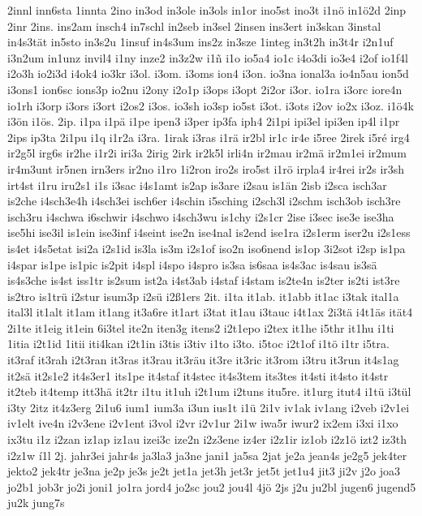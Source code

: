 {2innl
inn6sta
1innta
2ino
in3od
in3ole
in3ols
in1or
ino5st
ino3t
i1nö
in1ö2d
2inp
2inr
2ins.
ins2am
insch4
in7schl
in2seb
in3sel
2insen
ins3ert
in3skan
3instal
in4s3tät
in5sto
in3s2u
1insuf
in4s3um
ins2z
in3sze
1integ
in3t2h
in3t4r
i2n1uf
i3n2um
in1unz
invil4
i1ny
inze2
in3z2w
i1ñ
i1o
io5a4
io1c
i4o3di
io3e4
i2of
io1f4l
i2o3h
io2i3d
i4ok4
io3kr
i3ol.
i3om.
i3oms
ion4
i3on.
io3na
ional3a
io4n5au
ion5d
i3ons1
ion6sc
ions3p
io2nu
i2ony
i2o1p
i3ops
i3opt
2i2or
i3or.
io1ra
i3orc
iore4n
io1rh
i3orp
i3ors
i3ort
i2os2
i3os.
io3sh
io3sp
io5st
i3ot.
i3ots
i2ov
io2x
i3oz.
i1ö4k
i3ön
i1ös.
2ip.
i1pa
i1pä
i1pe
ipen3
i3per
ip3fa
iph4
2i1pi
ipi3el
ipi3en
ip4l
i1pr
2ips
ip3ta
2i1pu
i1q
i1r2a
i3ra.
1irak
i3ras
i1rä
ir2bl
ir1c
ir4e
i5ree
2irek
i5ré
irg4
ir2g5l
irg6s
ir2he
i1r2i
iri3a
2irig
2irk
ir2k5l
irli4n
ir2mau
ir2mä
ir2m1ei
ir2mum
ir4m3unt
ir5nen
irn3ers
ir2no
i1ro
1i2ron
iro2s
iro5st
i1rö
irpla4
ir4rei
ir2s
ir3sh
irt4st
i1ru
iru2s1
i1s
i3sac
i4s1amt
is2ap
is3are
i2sau
is1än
2isb
i2sca
isch3ar
is2che
i4sch3e4h
i4sch3ei
isch6er
i4schin
i5sching
i2sch3l
i2schm
isch3ob
isch3re
isch3ru
i4schwa
i6schwir
i4schwo
i4sch3wu
is1chy
i2s1cr
2ise
i3sec
ise3e
ise3ha
ise5hi
ise3il
is1ein
ise3inf
i4seint
ise2n
ise4nal
is2end
ise1ra
i2s1erm
iser2u
i2s1ess
is4et
i4s5etat
isi2a
i2s1id
is3la
is3m
i2s1of
iso2n
iso6nend
is1op
3i2sot
i2sp
is1pa
i4spar
is1pe
is1pic
is2pit
i4spl
i4spo
i4spro
is3sa
is6saa
is4s3ac
is4sau
is3sä
is4s3che
is4st
iss1tr
is2sum
ist2a
i4st3ab
i4staf
i4stam
is2te4n
is2ter
is2ti
ist3re
is2tro
is1trü
i2stur
isum3p
i2sü
i2ß1ers
2it.
i1ta
it1ab.
it1abb
it1ac
i3tak
ital1a
ital3l
it1alt
it1am
it1ang
it3a6re
it1art
i3tat
it1au
i3tauc
i4t1ax
2i3tä
i4t1äs
ität4
2i1te
it1eig
it1ein
6i3tel
ite2n
iten3g
itens2
i2t1epo
i2tex
it1he
i5thr
it1hu
i1ti
1itia
i2t1id
1itii
iti4kan
i2t1in
i3tis
i3tiv
i1to
i3to.
i5toc
i2t1of
i1tö
i1tr
i5tra.
it3raf
it3rah
i2t3ran
it3ras
it3rau
it3räu
it3re
it3ric
it3rom
i3tru
it3run
it4s1ag
it2sä
it2s1e2
it4s3er1
its1pe
it4staf
it4stec
it4s3tem
its3tes
it4sti
it4sto
it4str
it2teb
it4temp
itt3hä
it2tr
i1tu
it1uh
i2t1um
i2tuns
itu5re.
it1urg
itut4
i1tü
i3tül
i3ty
2itz
it4z3erg
2i1u6
ium1
ium3a
i3un
ius1t
i1ü
2i1v
iv1ak
iv1ang
i2veb
i2v1ei
iv1elt
ive4n
i2v3ene
i2v1ent
i3vol
i2vr
i2v1ur
2i1w
iwa5r
iwur2
ix2em
i3xi
i1xo
ix3tu
i1z
i2zan
iz1ap
iz1au
izei3c
ize2n
i2z3ene
iz4er
i2z1ir
iz1ob
i2z1ö
izt2
iz3th
i2z1w
í1l
2j.
jahr3ei
jahr4s
ja3la3
ja3ne
jani1
ja5sa
2jat
je2a
jean4s
je2g5
jek4ter
jekto2
jek4tr
je3na
je2p
je3s
je2t
jet1a
jet3h
jet3r
jet5t
jet1u4
jit3
ji2v
j2o
joa3
jo2b1
job3r
jo2i
joni1
jo1ra
jord4
jo2sc
jou2
jou4l
4jö
2js
j2u
ju2bl
jugen6
jugend5
ju2k
jung7s
}
